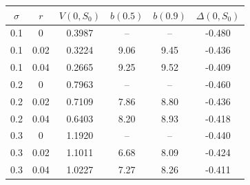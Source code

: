 \begin{tabular}{cccccc}
\toprule
$\sigma$ & $r$ & $V(0,S_0)$ & $b(0.5)$ & $b(0.9)$ & $\Delta(0,S_0)$ \\
\midrule
0.1 & 0 & 0.3987 & -- & -- & -0.480 \\
0.1 & 0.02 & 0.3224 & 9.06 & 9.45 & -0.436 \\
0.1 & 0.04 & 0.2665 & 9.25 & 9.52 & -0.409 \\
0.2 & 0 & 0.7963 & -- & -- & -0.460 \\
0.2 & 0.02 & 0.7109 & 7.86 & 8.80 & -0.436 \\
0.2 & 0.04 & 0.6403 & 8.20 & 8.93 & -0.418 \\
0.3 & 0 & 1.1920 & -- & -- & -0.440 \\
0.3 & 0.02 & 1.1011 & 6.68 & 8.09 & -0.424 \\
0.3 & 0.04 & 1.0227 & 7.27 & 8.26 & -0.411 \\
\bottomrule
\end{tabular}

